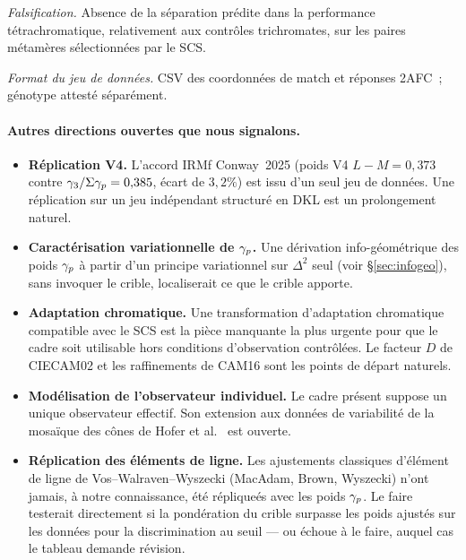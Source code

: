 \documentclass[12pt,a4paper]{article}
\begin{document}
\emph{Falsification.} Absence de la s\'eparation pr\'edite dans la
performance t\'etrachromatique, relativement aux contr\^oles
trichromates, sur les paires m\'etam\`eres s\'electionn\'ees par le SCS.

\emph{Format du jeu de donn\'ees.} CSV des coordonn\'ees de match et
r\'eponses 2AFC~; g\'enotype attest\'e s\'epar\'ement.

\paragraph{Autres directions ouvertes que nous signalons.}
\begin{itemize}[nosep]
\item \textbf{R\'eplication V4.} L'accord IRMf Conway~2025
  (poids V4 $L{-}M = 0{,}373$ contre
  $\gamma_{3}/\Sigma \gamma_{p} = 0{,}385$, \'ecart de $3{,}2\%$) est
  issu d'un seul jeu de donn\'ees. Une r\'eplication sur un jeu
  ind\'ependant structur\'e en DKL est un prolongement naturel.
\item \textbf{Caract\'erisation variationnelle de $\gamma_{p}$.} Une
  d\'erivation info-g\'eom\'etrique des poids $\gamma_{p}$ \`a partir
  d'un principe variationnel sur $\Delta^2$ seul (voir
  \S\ref{sec:infogeo}), sans invoquer le crible, localiserait ce que
  le crible apporte.
\item \textbf{Adaptation chromatique.} Une transformation
  d'adaptation chromatique compatible avec le SCS est la pi\`ece
  manquante la plus urgente pour que le cadre soit utilisable
  hors conditions d'observation contr\^ol\'ees. Le facteur $D$ de
  CIECAM02 et les raffinements de CAM16 sont les points de d\'epart
  naturels.
\item \textbf{Mod\'elisation de l'observateur individuel.} Le cadre
  pr\'esent suppose un unique observateur effectif. Son extension
  aux donn\'ees de variabilit\'e de la mosa\"ique des c\^ones de
  Hofer et al.~\cite{hofer2005} est ouverte.
\item \textbf{R\'eplication des \'el\'ements de ligne.} Les
  ajustements classiques d'\'el\'ement de ligne de
  Vos--Walraven--Wyszecki (MacAdam, Brown, Wyszecki) n'ont jamais,
  \`a notre connaissance, \'et\'e r\'eplique\'es avec les poids
  $\gamma_{p}$. Le faire testerait directement si la pond\'eration du
  crible surpasse les poids ajust\'es sur les donn\'ees pour la
  discrimination au seuil --- ou \'echoue \`a le faire, auquel cas le
  tableau demande r\'evision.
\end{itemize}
\end{document}
